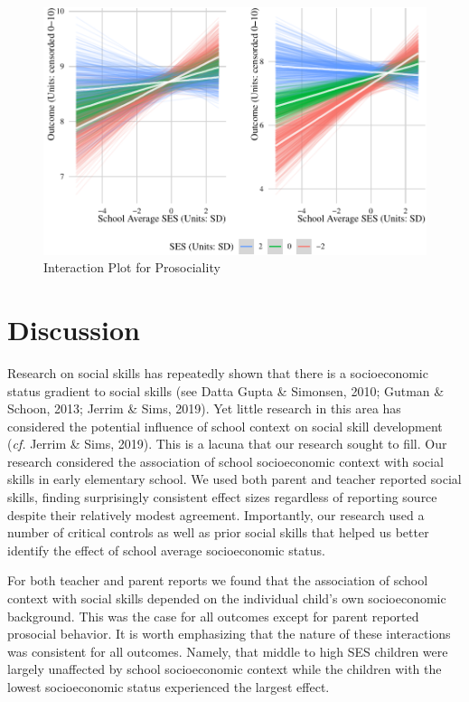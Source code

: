 \documentclass[
  english,
  man]{apa6}
\begin{document}
\begin{figure}
\centering
\includegraphics{manuscript_files/figure-latex/social-1.pdf}
\caption{\label{fig:social}Interaction Plot for Prosociality}
\end{figure}

\hypertarget{discussion}{%
\section{Discussion}\label{discussion}}

Research on social skills has repeatedly shown that there is a socioeconomic status gradient to social skills (see Datta Gupta \& Simonsen, 2010; Gutman \& Schoon, 2013; Jerrim \& Sims, 2019). Yet little research in this area has considered the potential influence of school context on social skill development (\emph{cf.} Jerrim \& Sims, 2019). This is a lacuna that our research sought to fill. Our research considered the association of school socioeconomic context with social skills in early elementary school. We used both parent and teacher reported social skills, finding surprisingly consistent effect sizes regardless of reporting source despite their relatively modest agreement. Importantly, our research used a number of critical controls as well as prior social skills that helped us better identify the effect of school average socioeconomic status.

For both teacher and parent reports we found that the association of school context with social skills depended on the individual child's own socioeconomic background. This was the case for all outcomes except for parent reported prosocial behavior. It is worth emphasizing that the nature of these interactions was consistent for all outcomes. Namely, that middle to high SES children were largely unaffected by school socioeconomic context while the children with the lowest socioeconomic status experienced the largest effect.
\end{document}
